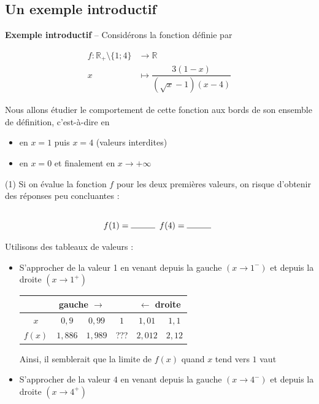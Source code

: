 \documentclass[a4paper,12pt]{article}
\begin{document}
\subsection{Un exemple introductif}
\begin{exemple}
	\tcblower

	{\bfseries Exemple introductif} -- 
	Considérons la fonction définie par

	\begin{align*}
		f : \mathbb{R}_+ \setminus \{1; 4\} &\to \mathbb{R}\\
		x &\mapsto \dfrac{3(1-x)}{(\sqrt{x}-1)(x-4)}
	\end{align*}

Nous allons étudier le comportement de cette fonction aux bords de son ensemble de définition, c'est-à-dire en 
\begin{itemize}
\item en $x = 1$ puis $x = 4$ (valeurs interdites)
\item en $x=0$ et finalement en $x \to +\infty$
\end{itemize}

\begin{tasks}(1)
\task Si on évalue la fonction $f$ pour les deux premières valeurs, on risque d'obtenir des réponses peu concluantes :

\[f(1) =\ligne{1} f(4) = \ligne{1}\]

\task Utilisons des tableaux de valeurs :
\begin{itemize}

\item S'approcher de la valeur 1 en venant depuis la gauche $(x \to 1^-)$ et depuis la droite $(x \to 1^+)$

\begin{center}
\begin{tabular}{|c|c|c|c|c|c|}
\hline
& \multicolumn{2}{c|}{gauche $\to$} & & \multicolumn{2}{c|}{$\leftarrow$ droite} \\
\hline
$x$ & $0,9$ & $0,99$ & $1$ & $1,01$ & $1,1$ \\
\hline
$f(x)$ & $1,886$ & $1,989$ & ??? & $2,012$ & $2,12$ \\
\hline
\end{tabular}
\end{center}

Ainsi, il semblerait que la limite de $f(x)$ quand $x$ tend vers $1$ vaut~

\item S'approcher de la valeur $4$ en venant depuis la gauche $(x \to 4^-)$ et depuis la droite $(x \to 4^+)$


\end{itemize}
\end{tasks}
\end{exemple}
\end{document}
